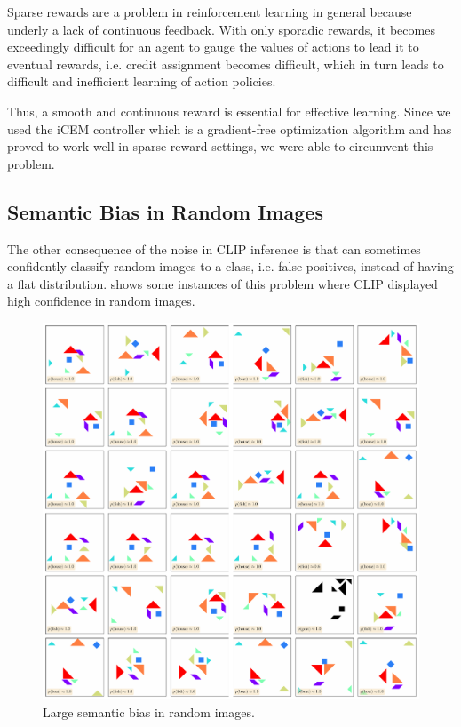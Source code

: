 Sparse rewards are a problem in reinforcement learning in general because underly a lack of continuous feedback. 
With only sporadic rewards, it becomes exceedingly difficult for an agent to gauge the values of actions to lead it to eventual rewards, i.e. credit assignment becomes difficult, which in turn leads to difficult and inefficient learning of action policies.


Thus, a smooth and continuous reward is essential for effective learning.
Since we used the iCEM controller which is a gradient-free optimization algorithm and has proved to work well in sparse reward settings, we were able to circumvent this problem.

\subsection{Semantic Bias in Random Images} %
\label{sec:inference-noise}
The other consequence of the noise in CLIP inference is that can sometimes confidently classify random images to a class, i.e. false positives, instead of having a flat distribution.
 shows some instances of this problem where CLIP displayed high confidence in random images.

\begin{figure}[h]
    \centering
    \includegraphics[width=\textwidth]{images/adversarial_samples.pdf}
    \caption{Large semantic bias in random images.}
    \label{fig:semantic-bias-random}
\end{figure}


